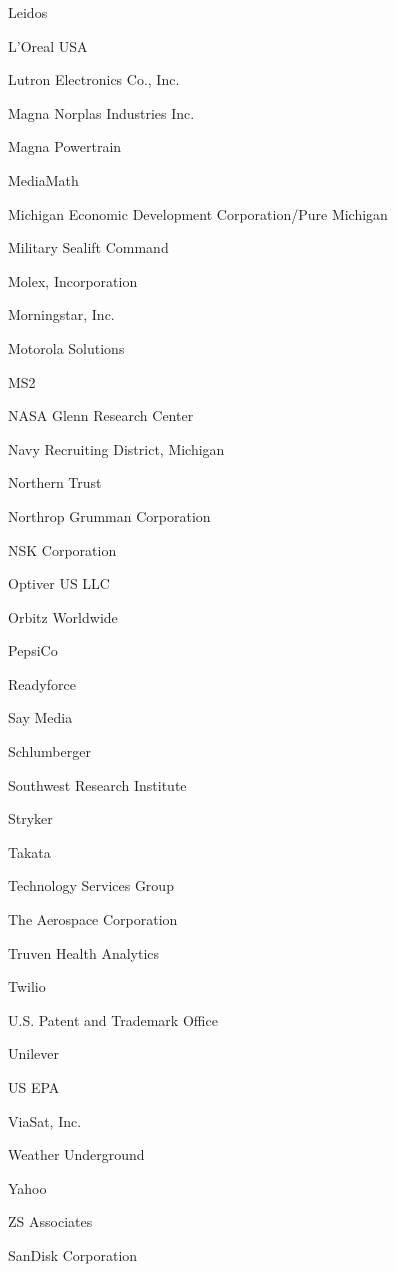 \documentclass[twoside]{article}
\begin{document}
\begin{center}
\begin{multicols}{5}
\begin{FlushLeft}
\begin{compactitem}
\item Leidos
\item L'Oreal USA
\item Lutron Electronics Co., Inc.
\item Magna Norplas Industries Inc.
\item Magna Powertrain
\item MediaMath
\item Michigan Economic Development Corporation/Pure Michigan
\item Military Sealift Command
\item Molex, Incorporation
\item Morningstar, Inc.
\item Motorola Solutions
\item MS2
\item NASA Glenn Research Center
\item Navy Recruiting District, Michigan
\item Northern Trust
\item Northrop Grumman Corporation
\item NSK Corporation
\item Optiver US LLC
\item Orbitz Worldwide
\item PepsiCo
\item Readyforce
\item Say Media
\item Schlumberger
\item Southwest Research Institute
\item Stryker
\item Takata
\item Technology Services Group
\item The Aerospace Corporation
\item Truven Health Analytics
\item Twilio
\item U.S. Patent and Trademark Office
\item Unilever
\item US EPA
\item ViaSat, Inc.
\item Weather Underground
\item Yahoo
\item ZS Associates
\item SanDisk Corporation
\end{compactitem}
        \end{FlushLeft}
        \vspace{1em}

\end{multicols}
\end{center}
\end{document}
